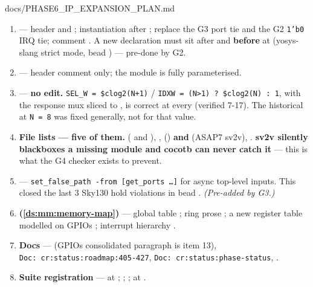 \begin{relocated}{docs/PHASE6_IP_EXPANSION_PLAN.md}
\begin{enumerate}
  , , ); the ports are already
   arrays.
\item
  \textbf{} --- header  and
  ; instantiation after ; replace the G3 port tie
  and the G2 \texttt{1'b0} IRQ tie;  comment
  . \warn{} A new  declaration must sit
  after  and \textbf{before}  at
   (yosys-slang strict mode, bead ) --- pre-done by
  G2.
\item
  \textbf{} --- header comment
   only; the module is fully parameterised.
\item
  \textbf{} --- \textbf{no edit.}
  \texttt{SEL\_\allowbreak{}W\ =\allowbreak{}\ \$clog2(N+\allowbreak{}1)}
  /
  \texttt{IDXW\ =\allowbreak{}\ (N>1)\ ?\ \$clog2(N)\ :\allowbreak{}\ 1},
  with the response mux sliced to , is correct
  at every  (verified 7-17). The historical  at
  \texttt{N\ =\allowbreak{}\ 8} was fixed generally, not for that value.
\item
  \textbf{File lists --- five of them.} 
  ( and ), ,
   () \textbf{and}
   (ASAP7 sv2v),
  . \warn{} \textbf{sv2v silently
  blackboxes a missing module and cocotb can never catch it} --- this is
  what the G4 checker exists to prevent.
\item
  \textbf{} ---
  \texttt{set\_\allowbreak{}false\_\allowbreak{}path\ -\allowbreak{}from\ [get\_\allowbreak{}ports\ …]}
  for async top-level inputs. This closed the last 3 Sky130 hold
  violations in bead . \emph{(Pre-added by G3.)}
\item
  \textbf{ (\cref{ds:mm:memory-map})} --- global table
  ; ring prose ; a new register table modelled
  on GPIO\textquotesingle s ; interrupt hierarchy
  .
\item
  \textbf{Docs} ---  (GPIO\textquotesingle s consolidated
  paragraph is item 13),
  \texttt{Doc:\allowbreak{}\ cr:\allowbreak{}status:\allowbreak{}roadmap:\allowbreak{}405-\allowbreak{}427},
  \texttt{Doc:\allowbreak{}\ cr:\allowbreak{}status:\allowbreak{}phase-\allowbreak{}status},
  .
\item
  \textbf{Suite registration} ---  at
  ;  ;
   ;  at
  .
\end{enumerate}


\end{relocated}
